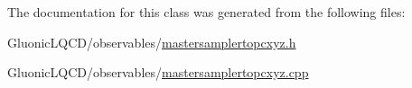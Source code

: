 The documentation for this class was generated from the following files\+:\begin{DoxyCompactItemize}
\item 
Gluonic\+L\+Q\+C\+D/observables/\mbox{\hyperlink{mastersamplertopcxyz_8h}{mastersamplertopcxyz.\+h}}\item 
Gluonic\+L\+Q\+C\+D/observables/\mbox{\hyperlink{mastersamplertopcxyz_8cpp}{mastersamplertopcxyz.\+cpp}}\end{DoxyCompactItemize}
